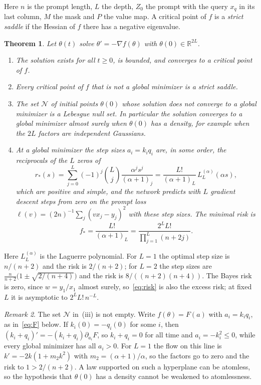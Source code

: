 \documentclass[11pt]{amsart}
\newtheorem{theorem}{Theorem}[section]
\theoremstyle{remark}
\newtheorem{remark}[theorem]{Remark}
\numberwithin{equation}{section}
\newcommand{\RR}{\mathbb{R}}
\begin{document}
Here $n$ is the prompt length, $L$ the depth, $Z_0$ the prompt with the query $x_q$ in its last column, $M$ the mask and $P$ the value map. A critical point of $f$ is a \emph{strict saddle} if the Hessian of $f$ there has a negative eigenvalue.

\begin{theorem}\label{thm:main}
Let $\theta(t)$ solve $\theta'=-\nabla f(\theta)$ with $\theta(0)\in\RR^{2L}$.
\begin{enumerate}[label=\textup{(\roman*)}]
\item The solution exists for all $t\ge0$, is bounded, and converges to a critical point of $f$.
\item Every critical point of $f$ that is not a global minimizer is a strict saddle.
\item The set $\mathcal N$ of initial points $\theta(0)$ whose solution does not converge to a global minimizer is a Lebesgue null set. In particular the solution converges to a global minimizer almost surely when $\theta(0)$ has a density, for example when the $2L$ factors are independent Gaussians.
\item At a global minimizer the step sizes $a_i=k_iq_i$ are, in some order, the reciprocals of the $L$ zeros of
\begin{equation}\label{eq:rstar}
r_*(s)=\sum_{j=0}^{L}(-1)^j\binom Lj\frac{\alpha^js^j}{(\alpha+1)_j}=\frac{L!}{(\alpha+1)_L}\,L_L^{(\alpha)}(\alpha s),
\end{equation}
which are positive and simple, and the network predicts with $L$ gradient descent steps from zero on the prompt loss $\ell(v)=(2n)^{-1}\sum_j(vx_j-y_j)^2$ with these step sizes. The minimal risk is
\begin{equation}\label{eq:risk}
f_*=\frac{L!}{(\alpha+1)_L}=\frac{2^LL!}{\prod_{j=1}^{L}(n+2j)}.
\end{equation}
\end{enumerate}
\end{theorem}

Here $L_L^{(\alpha)}$ is the Laguerre polynomial. For $L=1$ the optimal step size is $n/(n+2)$ and the risk is $2/(n+2)$; for $L=2$ the step sizes are $\frac n{n+2}\bigl(1\pm\sqrt{2/(n+4)}\bigr)$ and the risk is $8/((n+2)(n+4))$. The Bayes risk is zero, since $w=y_1/x_1$ almost surely, so~\eqref{eq:risk} is also the excess risk; at fixed $L$ it is asymptotic to $2^LL!\,n^{-L}$.

\begin{remark}\label{rem:exceptional}
The set $\mathcal N$ in~(iii) is not empty. Write $f(\theta)=F(a)$ with $a_i=k_iq_i$, as in~\eqref{eq:F} below. If $k_i(0)=-q_i(0)$ for some $i$, then $(k_i+q_i)'=-(k_i+q_i)\partial_{a_i}F$, so $k_i+q_i=0$ for all time and $a_i=-k_i^2\le0$, while every global minimizer has all $a_i>0$. For $L=1$ the flow on this line is $k'=-2k(1+m_2k^2)$ with $m_2=(\alpha+1)/\alpha$, so the factors go to zero and the risk to $1>2/(n+2)$. A law supported on such a hyperplane can be atomless, so the hypothesis that $\theta(0)$ has a density cannot be weakened to atomlessness.
\end{remark}
\end{document}
